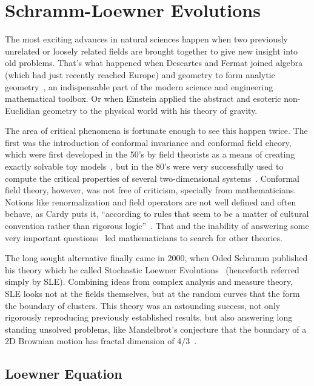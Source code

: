 \chapter{Schramm-Loewner Evolutions}
\label{ch:sle}

The most exciting advances in natural sciences happen when two previously
unrelated or loosely related fields are brought together to give new insight
into old problems. That's what happened when Descartes and Fermat joined
algebra (which had just recently reached Europe) and geometry to form analytic
geometry~\cite{Stillwell2010}, an indispensable part of the modern science and
engineering mathematical toolbox. Or when Einstein applied the abstract and
esoteric non-Euclidian geometry to the physical world with his theory of
gravity.

The area of critical phenomena is fortunate enough to see this happen twice.
The first was the introduction of conformal invariance and conformal field
eheory, which were first developed in the 50's by field theorists as a means of
creating exactly solvable toy models~\cite{Thirring1958}, but in the 80's were
very successfully used to compute the critical properties of several
two-dimensional systems~\cite{Nahm2000}. Conformal field theory, however, was
not free of criticism, specially from mathematicians. Notions like
renormalization and field operators are not well defined and often behave, as
Cardy puts it, ``according to rules that seem to be a matter of cultural
convention rather than rigorous logic''~\cite{Cardy2005}. That and the
inability of answering some very important questions~\cite{Langlands1994} led
mathematicians to search for other theories.

The long sought alternative finally came in 2000, when Oded Schramm published
his theory which he called Stochastic Loewner Evolutions~\cite{Schramm2000}
(henceforth referred simply by SLE). Combining ideas from complex analysis and
measure theory, SLE looks not at the fields themselves, but at the random
curves that the form the boundary of clusters. This theory was an astounding
success, not only rigorously reproducing previously established results, but
also answering long standing unsolved problems, like Mandelbrot's conjecture
that the boundary of a 2D Brownian motion has fractal dimension of
$4/3$~\cite{Lawler2001}.


\section{Loewner Equation}
\label{sec:le}


